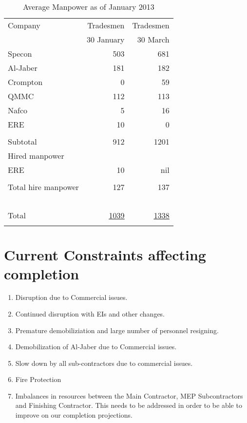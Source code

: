 \def\Z{\phantom{Z}}
\begin{table}[htbp]
\begin{center}
\begin{tabular}{l r r}
\toprule
Company           &Tradesmen   & Tradesmen\\
~                 &30 January  & 30 March \\
\midrule
Specon            &503         & 681\\
Al-Jaber          &181         &182\\
Crompton          &0           &59\\
QMMC              &112         &113\\
Nafco             &5           &16\\
ERE               &10          & 0\\
                  &\underline{\phantom{1075}}
                  &\underline{\phantom{1075}}\\
Subtotal          &912         &1201\\

Hired manpower    &            &\\
\Z ERE            &10          & nil\\

                  & \underline{\phantom{1075}}
                  & \underline{\phantom{1075}}\\
\Z Total hire manpower &127     &137\\
~&&\\
Total                      & \underline{\underline{1039}}       &\underline{\underline{1338}}\\
                             & &\\
\bottomrule
\end{tabular}
\caption{Average Manpower as of January 2013}
\label{tbl:manpower}
\end{center}
\end{table}



\section*{Current Constraints affecting completion}

\begin{enumerate}
\item Disruption due to Commercial issues.
\item Continued disruption with EIs and other changes.
\item Premature demobiliziation and large number of personnel resigning.
\item Demobilization of Al-Jaber due to Commercial issues.
\item Slow down by all sub-contractors due to commercial issues.
\item Fire Protection
\item Imbalances in resources between the Main Contractor, MEP Subcontractors and Finishing Contractor. This needs to be addressed in order to be able to improve on our completion projections.
\end{enumerate}

